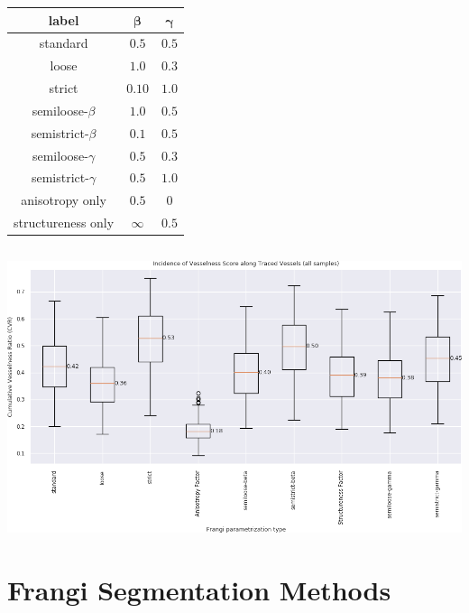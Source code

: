 \documentclass[9pt,notes]{beamer}
\begin{document}
\begin{frame}
\begin{columns}
  \begin{column}{0.4\textwidth}
    \begin{table}[p]\centering
      \begin{tabular}{|c|c|c|}
        \hline
        \textbf{label}  & $\bm{\beta}$ & $\bm{\gamma}$ \\ \hline
        standard & $0.5$ & $0.5$ \\ \hline
        loose & $ 1.0$ & $0.3$ \\ \hline
        strict & $0.10$ & $1.0$ \\ \hline
        semiloose-$\beta$ &$ 1.0$ & $0.5$ \\ \hline
        semistrict-$\beta$& $ 0.1$ &$ 0.5$ \\ \hline
        semiloose-$\gamma$ &$ 0.5$ & $0.3$ \\ \hline
        semistrict-$\gamma$& $ 0.5$ & $1.0$ \\ \hline
        anisotropy only & $ 0.5$& $0$ \\ \hline
        structureness only&  $ \infty$ & $0.5$ \\ \hline
      \end{tabular}
    \end{table}
  \end{column}
\end{columns}
\end{frame}

\begin{frame}
\includegraphics[width=\textwidth]{cvr_boxplot_wide-all-ucip-190322}
\end{frame}

\section{Frangi Segmentation Methods}
\end{document}
